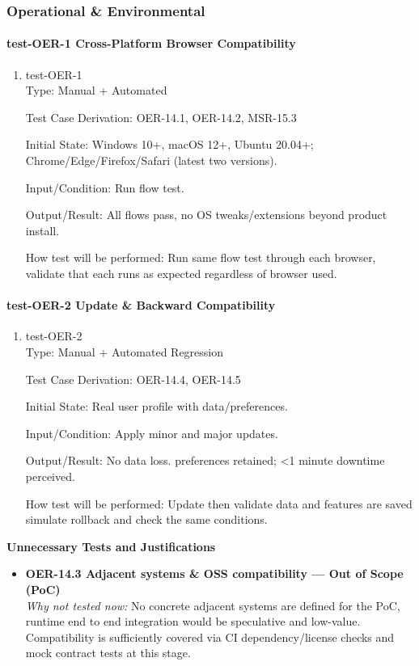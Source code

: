 \documentclass[12pt, titlepage]{article}
\begin{document}
\subsubsection{Operational \& Environmental}

\paragraph{test-OER-1 Cross-Platform Browser Compatibility}

\begin{enumerate}
\item{test-OER-1\\}
Type: Manual + Automated

Test Case Derivation: OER-14.1, OER-14.2, MSR-15.3

Initial State: Windows 10+, macOS 12+, Ubuntu 20.04+; Chrome/Edge/Firefox/Safari (latest two versions).

Input/Condition: Run flow test.

Output/Result: All flows pass, no OS tweaks/extensions beyond product install.

How test will be performed: Run same flow test through each browser, validate that each runs as expected regardless of browser used.
\end{enumerate}

\paragraph{test-OER-2 Update \& Backward Compatibility}

\begin{enumerate}
\item{test-OER-2\\}
Type: Manual + Automated Regression

Test Case Derivation: OER-14.4, OER-14.5

Initial State: Real user profile with data/preferences.

Input/Condition: Apply minor and major updates.

Output/Result: No data loss. preferences retained; <1 minute downtime perceived.

How test will be performed: Update then validate data and features are saved simulate rollback and check the same conditions.
\end{enumerate}

\noindent\textbf{Unnecessary Tests and Justifications}
\begin{itemize}
\item \textbf{OER-14.3 Adjacent systems \& OSS compatibility — Out of Scope (PoC)}\\
\emph{Why not tested now:} No concrete adjacent systems are defined for the PoC, runtime end to end integration would be speculative and low-value. Compatibility is sufficiently covered via CI dependency/license checks and mock contract tests at this stage.
\end{itemize}
\end{document}
